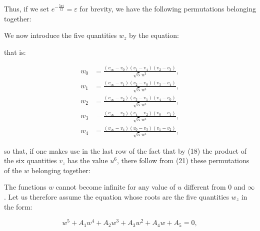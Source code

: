 
Thus, if we set $e^{-\frac{5\pi i}{12}} = \varepsilon$ for brevity, we have the
following permutations belonging together:


We now introduce the five quantities $w_z$ by the equation:


that is:

\[
\begin{aligned}
w_0 &= \frac{(v_\infty - v_0)(v_1-v_4)(v_2-v_3)}{\sqrt{5}\,u^3},\\
w_1 &= \frac{(v_\infty - v_1)(v_2-v_0)(v_3-v_4)}{\sqrt{5}\,u^3},\\
w_2 &= \frac{(v_\infty - v_2)(v_3-v_1)(v_4-v_0)}{\sqrt{5}\,u^3},\\
w_3 &= \frac{(v_\infty - v_3)(v_4-v_2)(v_0-v_1)}{\sqrt{5}\,u^3},\\
w_4 &= \frac{(v_\infty - v_4)(v_0-v_3)(v_1-v_2)}{\sqrt{5}\,u^3},
\end{aligned}
\]

so that, if one makes use in the last row of the fact that by (18) the product
of the six quantities $v_z$ has the value $u^6$, there follow from (21) these
permutations of the $w$ belonging together:


The functions $w$ cannot become infinite for any value of $u$ different from 0
and $\infty$. Let us therefore assume the equation whose roots are the five
quantities $w_z$ in the form:

\[
w^5 + A_1w^4 + A_2w^3 + A_3w^2 + A_4w + A_5 = 0,
\]

